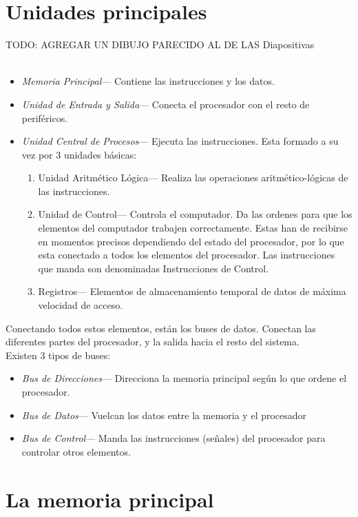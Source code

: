 \documentclass[a4paper,11pt,spanish]{report}
\begin{document}
\section{Unidades principales}

TODO: AGREGAR UN DIBUJO PARECIDO AL DE LAS Diapositivas
\\\\
\begin{itemize}
\item \emph{Memoria Principal}--- Contiene las instrucciones y los datos.
\item \emph{Unidad de Entrada y Salida}--- Conecta el procesador con el resto de periféricos.
\item \emph{Unidad Central de Procesos}--- Ejecuta las instrucciones. Esta formado a su vez por 3 unidades básicas:
\begin{enumerate}
\item Unidad Aritmético Lógica--- Realiza las operaciones aritmético-lógicas de las instrucciones.
\item Unidad de Control--- Controla el computador. Da las ordenes para que los elementos del computador trabajen correctamente. Estas han de recibirse en momentos precisos dependiendo del estado del procesador, por lo que esta conectado a todos los elementos del procesador. Las instrucciones que manda son denominadas Instrucciones de Control.
\item Registros--- Elementos de almacenamiento temporal de datos de máxima velocidad de acceso.
\end{enumerate}
\end{itemize}
Conectando todos estos elementos, están los buses de datos. Conectan las diferentes partes del procesador, y la salida hacia el resto del sistema.
\\
Existen 3 tipos de buses:
\begin{itemize}
\item \emph{Bus de Direcciones}--- Direcciona la memoria principal según lo que ordene el procesador.
\item \emph{Bus de Datos}--- Vuelcan los datos entre la memoria y el procesador
\item \emph{Bus de Control}--- Manda las instrucciones (señales) del procesador para controlar otros elementos.
\end{itemize}

\section{La memoria principal}
\end{document}

